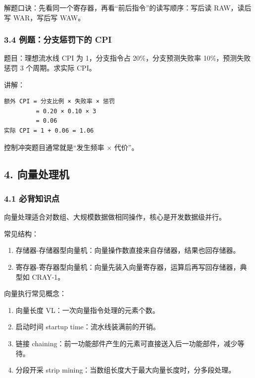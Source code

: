 \documentclass[
]{ctexart}
\providecommand{\tightlist}{%
  \setlength{\itemsep}{0pt}\setlength{\parskip}{0pt}}
\begin{document}
解题口诀：先看同一个寄存器，再看``前后指令''的读写顺序：写后读
RAW，读后写 WAR，写后写 WAW。

\subsubsection{3.4 例题：分支惩罚下的
CPI}\label{ux4f8bux9898ux5206ux652fux60e9ux7f5aux4e0bux7684-cpi}

题目：理想流水线 CPI 为 1，分支指令占 20\%，分支预测失败率
10\%，预测失败惩罚 3 个周期。求实际 CPI。

讲解：

\begin{lstlisting}
额外 CPI = 分支比例 × 失败率 × 惩罚
         = 0.20 × 0.10 × 3
         = 0.06
实际 CPI = 1 + 0.06 = 1.06
\end{lstlisting}

控制冲突题目通常就是``发生频率 × 代价''。

\subsection{4. 向量处理机}\label{ux5411ux91cfux5904ux7406ux673a}

\subsubsection{4.1 必背知识点}\label{ux5fc5ux80ccux77e5ux8bc6ux70b9-3}

向量处理适合对数组、大规模数据做相同操作，核心是开发数据级并行。

常见结构：

\begin{enumerate}
\def\labelenumi{\arabic{enumi}.}
\tightlist
\item
  存储器-存储器型向量机：向量操作数直接来自存储器，结果也回存储器。
\item
  寄存器-寄存器型向量机：向量先装入向量寄存器，运算后再写回存储器，典型如
  CRAY-1。
\end{enumerate}

向量执行常见概念：

\begin{enumerate}
\def\labelenumi{\arabic{enumi}.}
\tightlist
\item
  向量长度 VL：一次向量指令处理的元素个数。
\item
  启动时间 startup time：流水线装满前的开销。
\item
  链接
  chaining：前一功能部件产生的元素可直接送入后一功能部件，减少等待。
\item
  分段开采 strip mining：当数组长度大于最大向量长度时，分多段处理。
\end{enumerate}
\end{document}
